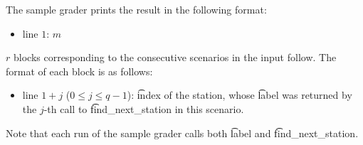 The sample grader prints the result in the following format:
\begin{itemize}
\item line $1$: $m$
\end{itemize}

$r$ blocks corresponding to the consecutive scenarios in the input follow. The format of each block is
as follows:

\begin{itemize}
\item line $1 + j$ ($0 \leq j \leq q - 1$): \t{index} of the station, whose \t{label} was returned by the $j$-th call to \t{find\_next\_station} in this scenario.
\end{itemize}

Note that each run of the sample grader calls both \t{label} and \t{find\_next\_station}.
